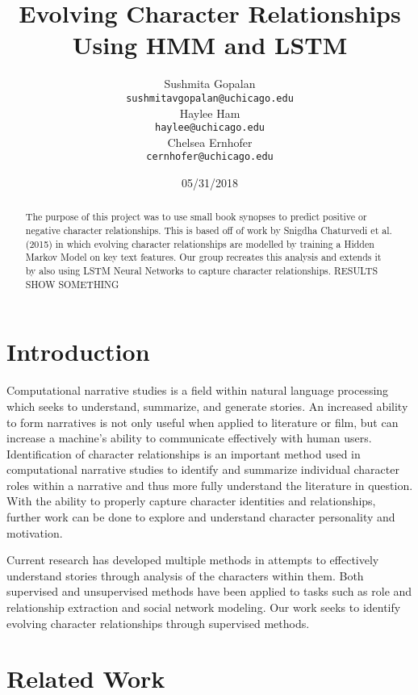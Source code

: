 \documentclass[11pt,a4paper]{article}
\title{Evolving Character Relationships Using HMM and LSTM}
\author{Sushmita Gopalan \\
  {\tt sushmitavgopalan@uchicago.edu} \\\And
  Haylee Ham \\
  {\tt haylee@uchicago.edu} \\\And
  Chelsea Ernhofer \\
  {\tt cernhofer@uchicago.edu} \\}
\date{05/31/2018}
\begin{document}
\maketitle
\begin{abstract}
  The purpose of this project was to use small book synopses to predict positive or negative character relationships. This is based off of work by Snigdha Chaturvedi et al. (2015) in which evolving character relationships are modelled by training a Hidden Markov Model on key text features. Our group recreates this analysis and extends it by also using LSTM Neural Networks to capture character relationships. RESULTS SHOW SOMETHING  
\end{abstract}

\section{Introduction}

Computational narrative studies is a field within natural language processing which seeks to understand, summarize, and generate stories. An increased ability to form narratives is not only useful when applied to literature or film, but can increase a machine's ability to communicate effectively with human users. Identification of character relationships is an important method used in computational narrative studies to identify and summarize individual character roles within a narrative and thus more fully understand the literature in question. With the ability to properly capture character identities and relationships, further work can be done to explore and understand character personality and motivation.

Current research has developed multiple methods in attempts to effectively understand stories through analysis of the characters within them.  Both supervised and unsupervised methods have been applied to tasks such as role and relationship extraction and social network modeling. Our work seeks to identify evolving character relationships through supervised methods. 

\section{Related Work}
\end{document}
